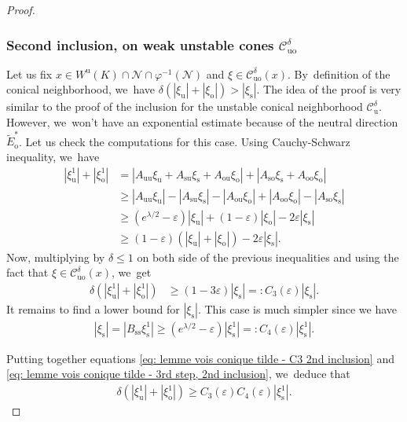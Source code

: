 \documentclass[JEP,XML,SOM,Unicode,NoEqCountersInSection,NoFloatCountersInSection,published]{cedram}
\newcommand{\ro}{\mathrm{o}}
\newcommand{\rs}{\mathrm{s}}
\newcommand{\rso}{\mathrm{so}}
\newcommand{\ru}{\mathrm{u}}
\newcommand{\ruo}{\mathrm{uo}}
\theoremstyle{definition}
\theoremstyle{plain}
\newcommand{\Ccal}{\mathcal{C}}
\newcommand{\Ncal}{\mathcal{N}}
\begin{document}
\begin{proof}
\subsubsection*{Second inclusion, on weak unstable cones $\Ccal_{\ruo}^{\delta}$} Let us fix $x \in W^\ru (K) \cap \Ncal \cap \varphi^{-1}(\Ncal) $ and $\xi \in \Ccal_{\ruo}^{\delta} (x)$. By~definition of the conical neighborhood, we~have $\delta (|\xi_\ru| + |\xi_\ro|) > |\xi_\rs| $. The idea of the proof is very similar to the proof of the inclusion for the unstable conical neighborhood $\Ccal_{\ru}^{\delta}$. However, we~won't have an exponential estimate because of the neutral direction $\widetilde{E}_\ro^*$. Let us check the computations for this case. Using Cauchy-Schwarz inequality, we~have
\begin{align*}
|\xi_\ru^1| + |\xi_\ro^1| &= |A_{\ru\ru} \xi_\ru + A_{\rs\ru} \xi_\rs + A_{\ro\ru} \xi_\ro | + |A_{\rso} \xi_\rs + A_{\ro\ro} \xi_\ro | \\
&\geq |A_{\ru\ru} \xi_\ru| - |A_{\rs\ru} \xi_\rs| - |A_{\ro\ru} \xi_\ro | + | A_{\ro\ro} \xi_\ro | - | A_{\rso} \xi_\rs |\\
&\geq (e^{\lambda/2} - \varepsilon)|\xi_\ru| + (1 - \varepsilon) |\xi_\ro| - 2\varepsilon|\xi_\rs| \\
&\geq (1 - \varepsilon) (|\xi_\ru| + |\xi_\ro|) - 2\varepsilon |\xi_\rs|.
\end{align*}
Now, multiplying by $\delta \leq 1$ on both side of the previous inequalities and using the fact that $\xi \in \Ccal_{\ruo}^{\delta} (x)$, we~get
\begin{equation}\label{eq: lemme vois conique tilde - C3 2nd inclusion}
\begin{split}
\delta (|\xi_\ru^1| + |\xi_\ro^1|) &\geq (1 - 3\varepsilon) |\xi_\rs| =: C_3 (\varepsilon) |\xi_\rs|.
\end{split}
\end{equation}
It remains to find a lower bound for $|\xi_\rs|$. This case is much simpler since we have
\begin{align}\label{eq: lemme vois conique tilde - 3rd step, 2nd inclusion}
|\xi_\rs| = |B_{\rs\rs} \xi_\rs^1| \geq (e^{\lambda/2} -\varepsilon) |\xi_\rs^1| =: C_4 (\varepsilon) |\xi_\rs^1|.
\end{align}

Putting together equations \eqref{eq: lemme vois conique tilde - C3 2nd inclusion} and \eqref{eq: lemme vois conique tilde - 3rd step, 2nd inclusion}, we~deduce that
\begin{align*}
\delta(|\xi_\ru^1| + |\xi_\ro^1|) \geq C_3 (\varepsilon) C_4 (\varepsilon) |\xi_\rs^1|.
\end{align*}


\end{proof}
\end{document}
